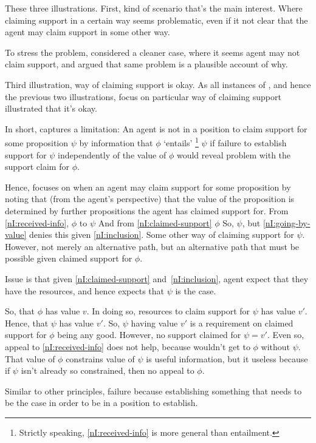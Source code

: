 \begin{note}
  These three illustrations.
  First, kind of scenario that's the main interest.
  Where claiming support in a certain way seems problematic, even if it not clear that the agent may claim support in some other way.

  To stress the problem, considered a cleaner case, where it seems agent may not claim support, and argued that same problem is a plausible account of why.

  Third illustration, way of claiming support is okay.
  As all instances of \nI{}, and hence the previous two illustrations, focus on particular way of claiming support illustrated that it's okay.
\end{note}

\begin{note}[Intuition]
  In short, \nI{} captures a limitation: An agent is not in a position to claim support for some proposition \(\psi\) by information that \(\phi\) `entails'\nolinebreak
  \footnote{Strictly speaking, \ref{nI:received-info} is more general than entailment.}
  \(\psi\) if failure to establish support for \(\psi\) independently of the value of \(\phi\) would reveal problem with the support claim for \(\phi\).

  Hence, \nI{} focuses on when an agent may claim support for some proposition by noting that (from the agent's perspective) that the value of the proposition is determined by further propositions the agent has claimed support for.
  From \ref{nI:received-info}, \(\phi\) to \(\psi\)
  And from \ref{nI:claimed-support} \(\phi\)
  So, \(\psi\), but \ref{nI:going-by-value} denies this given \ref{nI:inclusion}.
  Some other way of claiming support for \(\psi\).
  However, not merely an alternative path, but an alternative path that must be possible given claimed support for \(\phi\).

  Issue is that given \ref{nI:claimed-support} and~\ref{nI:inclusion}, agent expect that they have the resources, and hence expects that \(\psi\) is the case.

  So, that \(\phi\) has value \(v\).
  In doing so, resources to claim support for \(\psi\) has value \(v'\).
  Hence, that \(\psi\) has value \(v'\).
  So, \(\psi\) having value \(v'\) is a requirement on claimed support for \(\phi\) being any good.
  However, no support claimed for \(\psi = v'\).
  Even so, appeal to \ref{nI:received-info} does not help, because wouldn't get to \(\phi\) without \(\psi\).
  That value of \(\phi\) constrains value of \(\psi\) is useful information, but it useless because if \(\psi\) isn't already so constrained, then no appeal to \(\phi\).

  Similar to other principles, failure because establishing something that needs to be the case in order to be in a position to establish.
\end{note}

